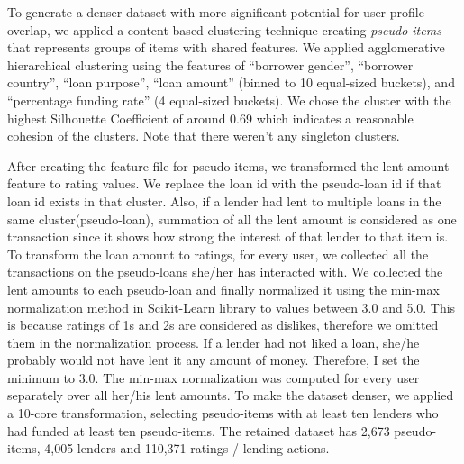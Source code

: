     To generate a denser dataset with more significant potential for user profile overlap, we applied a content-based clustering technique creating \textit{pseudo-items} that represents groups of items with shared features. We applied agglomerative hierarchical clustering \cite{rokach2005clustering} using the features of ``borrower gender'', ``borrower country'', ``loan purpose'', ``loan amount'' (binned to 10 equal-sized buckets), and ``percentage funding rate'' (4 equal-sized buckets). We chose the cluster with the highest Silhouette Coefficient \cite{rousseeuw1987silhouettes} of around 0.69 which indicates a reasonable cohesion of the clusters. Note that there weren't any singleton clusters.
    
    After creating the feature file for pseudo items, we transformed the lent amount feature to rating values. We replace the loan id with the pseudo-loan id if that loan id exists in that cluster. Also, if a lender had lent to multiple loans in the same cluster(pseudo-loan), summation of all the lent amount is considered as one transaction since it shows how strong the interest of that lender to that item is. To transform the loan amount to ratings, for every user, we collected all the transactions on the pseudo-loans she/her has interacted with. We collected the lent amounts to each pseudo-loan and finally normalized it using the min-max normalization method in Scikit-Learn \cite{scikit-learn} library to values between 3.0 and 5.0. This is because ratings of 1s and 2s are considered as dislikes, therefore we omitted them in the normalization process. If a lender had not liked a loan, she/he probably would not have lent it any amount of money. Therefore, I set the minimum to 3.0. The min-max normalization was computed for every user separately over all her/his lent amounts. To make the dataset denser, we applied a 10-core transformation, selecting pseudo-items with at least ten lenders who had funded at least ten pseudo-items. The retained dataset has 2,673 pseudo-items, 4,005 lenders and 110,371 ratings / lending actions.
    

    
